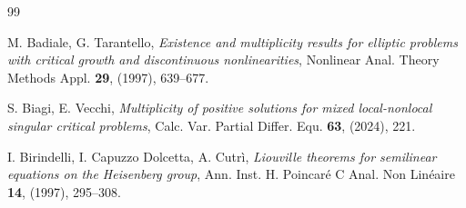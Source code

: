\documentclass[11pt]{amsart}
\numberwithin{equation}{section} %
\theoremstyle{definition}
\begin{document}
\begin{thebibliography}{99}
	
	
	
%	
	
	
	
	
	M. Badiale, G. Tarantello, 
	{\em Existence and multiplicity results for elliptic problems with critical growth and discontinuous nonlinearities}, 
	Nonlinear Anal. Theory Methods Appl. {\bf 29}, (1997), 639--677. 
	
	
	
	
	
	
	S. Biagi, E. Vecchi,
	{\em Multiplicity of positive solutions for mixed local-nonlocal singular critical problems}, 
	Calc. Var. Partial Differ. Equ. {\bf 63}, (2024), 221. 
	
	I. Birindelli, I. Capuzzo Dolcetta, A. Cutrì, 
	{\em Liouville theorems for semilinear equations on
		the Heisenberg group}, 
	Ann. Inst. H. Poincar\'{e} C Anal. Non Lin\'{e}aire {\bf 14}, (1997), 295--308.
	

\end{thebibliography}
\end{document}
